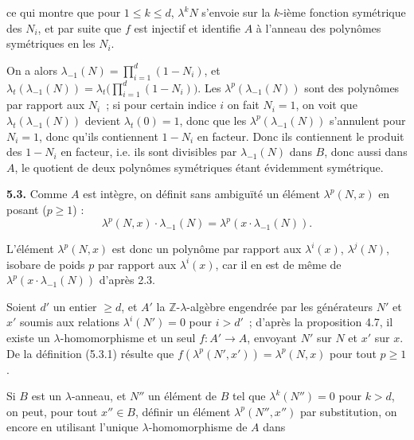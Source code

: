 ce qui
montre que pour \(1\le k\le d\), \(\lambda^k N\) s'envoie sur la \(k\)-ième fonction symétrique des \(N_i\), et par suite que \(f\) est injectif et identifie \(A\) à l'anneau des polynômes symétriques en les \(N_i\).

On a alors \(\lambda_{-1}(N)=\prod_{i=1}^{d}(1-N_i)\), et \(\lambda_t(\lambda_{-1}(N))=\lambda_t\bigl(\prod_{i=1}^{d}(1-N_i)\bigr)\). Les \(\lambda^p(\lambda_{-1}(N))\) sont des polynômes par rapport aux \(N_i\)~; si pour certain indice \(i\) on fait \(N_i=1\), on voit que \(\lambda_t(\lambda_{-1}(N))\) devient \(\lambda_t(0)=1\), donc que les \(\lambda^p(\lambda_{-1}(N))\) s'annulent pour \(N_i=1\), donc qu'ils contiennent \(1-N_i\) en facteur. Donc ils contiennent le produit des \(1-N_i\) en facteur, i.e. ils sont divisibles par \(\lambda_{-1}(N)\) dans \(B\), donc aussi dans \(A\), le quotient de deux polynômes symétriques étant évidemment symétrique.

\textbf{5.3.} Comme \(A\) est intègre, on définit sans ambiguïté un élément \(\lambda^p(N,x)\) en posant (\(p\ge1\)) :
\begin{equation}\tag{5.3.1}
  \lambda^p(N,x)\cdot\lambda_{-1}(N)=\lambda^p(x\cdot\lambda_{-1}(N)).
\end{equation}

L'élément \(\lambda^p(N,x)\) est donc un polynôme par rapport aux \(\lambda^i(x)\), \(\lambda^j(N)\), isobare de poids \(p\) par rapport aux \(\lambda^i(x)\), car il en est de même de \(\lambda^p(x\cdot\lambda_{-1}(N))\) d'après 2.3.

Soient \(d'\) un entier \(\ge d\), et \(A'\) la \(\mathbb Z\)-\(\lambda\)-algèbre engendrée par les générateurs \(N'\) et \(x'\) soumis aux relations \(\lambda^i(N')=0\) pour \(i>d'\)~; d'après la proposition 4.7, il existe un \(\lambda\)-homomorphisme et un seul \(f:A'\longrightarrow A\), envoyant \(N'\) sur \(N\) et \(x'\) sur \(x\). De la définition (5.3.1) résulte que \(f(\lambda^p(N',x'))=\lambda^p(N,x)\) pour tout \(p\ge1\).

Si \(B\) est un \(\lambda\)-anneau, et \(N''\) un élément de \(B\) tel que \(\lambda^k(N'')=0\) pour \(k>d\), on peut, pour tout \(x''\in B\), définir un élément \(\lambda^p(N'',x'')\) par substitution, on encore en utilisant l'unique \(\lambda\)-homomorphisme de \(A\) dans 
